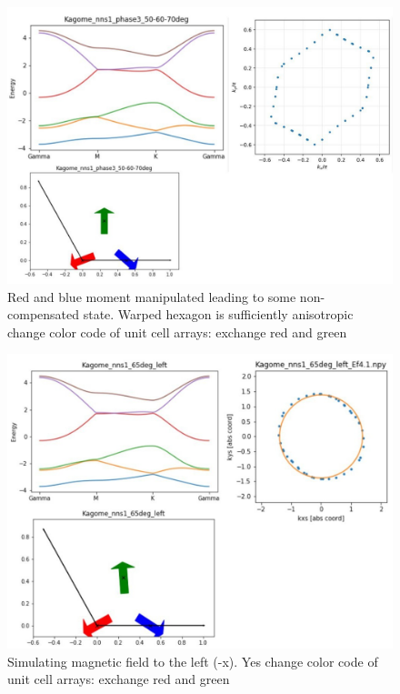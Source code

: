 \documentclass[prb,showpacs,amsmath,amssymb,superscriptaddress,twocolumn,floatfix]{revtex4-1}
\begin{document}
\begin{appendix}
\begin{figure}
	\centering
	\includegraphics[width=0.9\linewidth]{img_total/total_Kagome_phase3_50-60-70}
	\caption{Red and blue moment manipulated leading to some non-compensated state. Warped hexagon is sufficiently anisotropic{\color{red} change color code of unit cell arrays: exchange red and green}}
	\label{fig:totalkagomephase350-60-70}
\end{figure}

\begin{figure}
	\centering
	\includegraphics[width=0.9\linewidth]{img_total/total_Kagome_phase3_65L}
	\caption{Simulating magnetic field to the left (-x). Yes{\color{red} change color code of unit cell arrays: exchange red and green} }
	\label{fig:totalkagomephase365l}
\end{figure}



\end{appendix}
\end{document}

